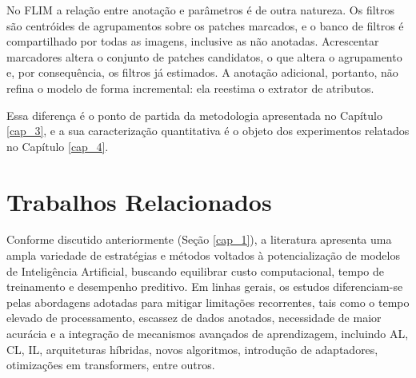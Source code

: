 No \ac{FLIM} a relação entre anotação e parâmetros é de outra natureza. Os filtros são centróides de agrupamentos sobre os patches marcados, e o banco de filtros é compartilhado por todas as imagens, inclusive as não anotadas. Acrescentar marcadores altera o conjunto de patches candidatos, o que altera o agrupamento e, por consequência, os filtros já estimados. A anotação adicional, portanto, não refina o modelo de forma incremental: ela reestima o extrator de atributos.

Essa diferença é o ponto de partida da metodologia apresentada no Capítulo \ref{cap_3}, e a sua caracterização quantitativa é o objeto dos experimentos relatados no Capítulo \ref{cap_4}.


\section{Trabalhos Relacionados}

Conforme discutido anteriormente (Seção \ref{cap_1}), a literatura apresenta uma ampla variedade de estratégias e métodos voltados à potencialização de modelos de Inteligência Artificial, buscando equilibrar custo computacional, tempo de treinamento e desempenho preditivo. Em linhas gerais, os estudos diferenciam-se pelas abordagens adotadas para mitigar limitações recorrentes, tais como o tempo elevado de processamento, escassez de dados anotados, necessidade de maior acurácia e a integração de mecanismos avançados de aprendizagem, incluindo \ac{AL}, \ac{CL}, \ac{IL}, arquiteturas híbridas, novos algoritmos, introdução de adaptadores, otimizações em transformers, entre outros.


